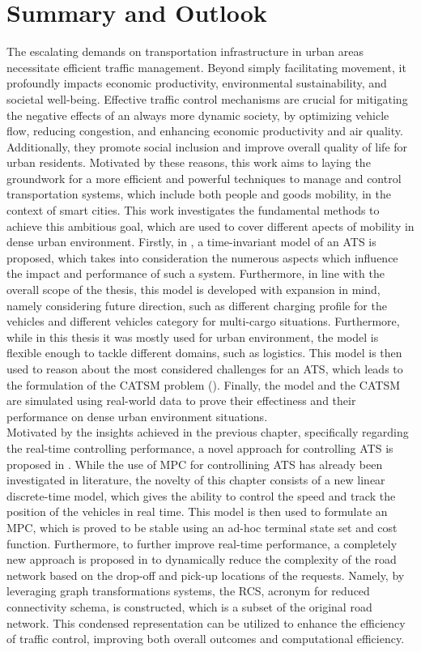 \chapter{Summary and Outlook}\label{ch:summary}
The escalating demands on transportation infrastructure in urban areas necessitate efficient traffic management. Beyond simply facilitating movement, it profoundly impacts economic productivity, environmental sustainability, and societal well-being.  Effective traffic control mechanisms are crucial for mitigating the negative effects of an always more dynamic society, by optimizing vehicle flow, reducing congestion, and enhancing economic productivity and air quality. Additionally, they promote social inclusion and improve overall quality of life for urban residents. Motivated by these reasons, this work aims to laying the groundwork for a more efficient and powerful techniques to manage and control transportation systems, which include both people and goods mobility, in the context of smart cities. This work investigates the fundamental methods to achieve this ambitious goal, which are used to cover different apects of mobility in dense urban environment. Firstly, in , a time-invariant model of an ATS is proposed, which takes into consideration the numerous aspects which influence the impact and performance of such a system. Furthermore, in line with the overall scope of the thesis, this model is developed with expansion in mind, namely considering future direction, such as different charging profile for the vehicles and different vehicles category for multi-cargo situations. Furthermore, while in this thesis it was mostly used for urban environment, the model is flexible enough to tackle different domains, such as logistics. This model is then used to reason about the most considered challenges for an ATS, which leads to the formulation of the CATSM problem (). Finally, the model and the CATSM are simulated using real-world data to prove their effectiness and their performance on dense urban environment situations. \\
Motivated by the insights achieved in the previous chapter, specifically regarding the real-time controlling performance, a novel approach for controlling ATS is proposed in . While the use of MPC for controllining ATS has already been investigated in literature, the novelty of this chapter consists of a new linear discrete-time model, which gives the ability to control the speed and track the position of the vehicles in real time. This model is then used to formulate an MPC, which is proved to be stable using an ad-hoc terminal state set and cost function. Furthermore, to further improve real-time performance, a completely new approach is proposed in  to dynamically reduce the complexity of the road network based on the drop-off and pick-up locations of the requests. Namely, by leveraging graph transformations systems, the RCS, acronym for reduced connectivity schema, is constructed, which is  a subset of the original road network. This condensed representation can be utilized to enhance the efficiency of traffic control, improving both overall outcomes and computational efficiency.\\

